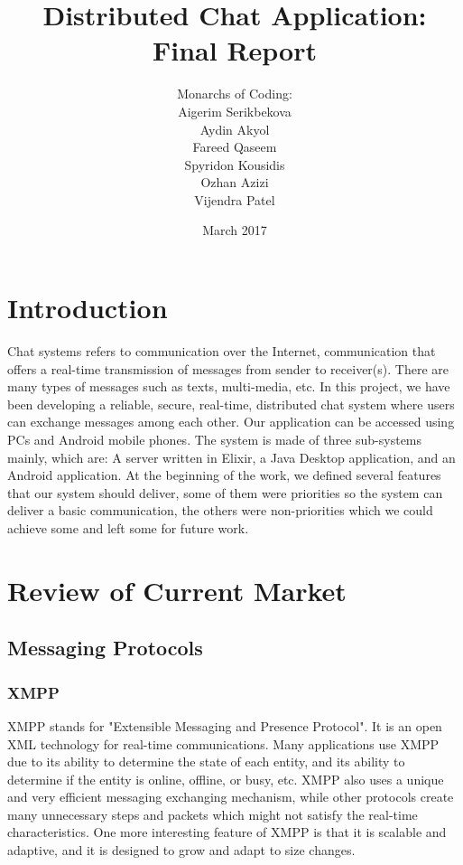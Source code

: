 \documentclass[11pt,a4paper]{report}
\begin{document}
\title{Distributed Chat Application: Final Report}
\author{Monarchs of Coding:\\
  Aigerim Serikbekova\\
  Aydin Akyol\\
  Fareed Qaseem\\
  Spyridon Kousidis\\
  Ozhan Azizi\\
  Vijendra Patel}
\date{March 2017}
\maketitle

\tableofcontents


\chapter{Introduction}

Chat systems refers to communication over the Internet, communication that offers a real-time transmission of messages from sender to receiver(s). There are many types of messages such as texts, multi-media, etc. In this project, we have been developing a reliable, secure, real-time, distributed chat system where users can exchange messages among each other. Our application can be accessed using PCs and Android mobile phones.
The system is made of three sub-systems mainly, which are: A server written in Elixir, a Java Desktop application, and an Android application.
At the beginning of the work, we defined several features that our system should deliver, some of them were priorities so the system can deliver a basic communication, the others were non-priorities which we could achieve some and left some for future work.

\chapter{Review of Current Market}

\section{Messaging Protocols}

\subsection{XMPP}
XMPP stands for "Extensible Messaging and Presence Protocol". It is an open XML technology for real-time communications. Many applications use XMPP due to its ability to determine the state of each entity, and its ability to determine if the entity is online, offline, or busy, etc. XMPP also uses a unique and very efficient messaging exchanging mechanism, while other protocols create many unnecessary steps and packets which might not satisfy the real-time characteristics. One more interesting feature of XMPP is that it is scalable and adaptive, and it is designed to grow and adapt to size changes.
\end{document}
